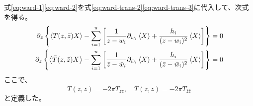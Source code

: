 \documentclass[11pt, aps, longbibliography]{article}
\numberwithin{equation}{section}
\begin{document}
        式\eqref{eq:ward-1}\eqref{eq:ward-2}を式\eqref{eq:ward-trans-2}\eqref{eq:ward-trans-3}に代入して、次式を得る。
        \begin{align}
            \partial_{\bar{z}}\left\{ \expval{T(z,\bar{z})X} - \sum_{i=1}^{n} \left[ \frac{1}{z-w_i}\partial_{w_i}\expval{X} + \frac{h_i}{(z-w_i)^2}\expval{X} \right] \right\} &= 0 \label{eq:tx1} \\
            \partial_{z}\left\{ \expval{\bar{T}(z,\bar{z})X} - \sum_{i=1}^{n} \left[ \frac{1}{\bar{z}-\bar{w}_i}\partial_{\bar{w}_i}\expval{X} + \frac{\bar{h}_i}{(\bar{z}-\bar{w}_i)^2}\expval{X} \right] \right\} &= 0 \label{eq:tx2}
        \end{align}
        ここで、
        \begin{equation}\label{eq:def-T}
            T(z,\bar{z}) = -2\pi T_{zz}, \quad \bar{T}(z,\bar{z}) = -2\pi T_{\bar{z}\bar{z}}
        \end{equation}
        と定義した。
\end{document}
